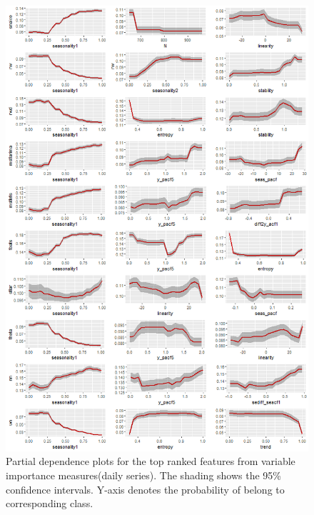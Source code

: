 \documentclass[11pt,a4paper,]{article}
\begin{document}
\begin{figure}
\centering
\includegraphics{figures/hourlypdp-1.png}
\caption{\label{fig:hourlypdp}Partial dependence plots for the top ranked
features from variable importance measures(daily series). The shading
shows the 95\% confidence intervals. Y-axis denotes the probability of
belong to corresponding class.}
\end{figure}

\newpage
\end{document}
